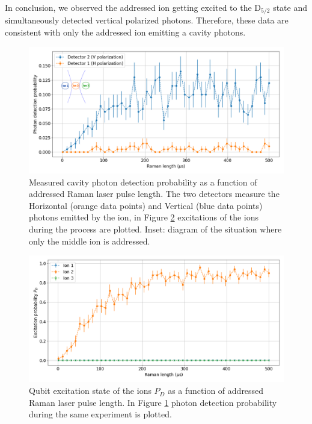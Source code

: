 In conclusion, we observed the addressed ion getting excited to the $\text{D}_{5/2}$ state and simultaneously detected vertical polarized photons. Therefore, these data are consistent with only the addressed ion emitting a cavity photons.
\begin{figure}
\centering
\includegraphics[width=\textwidth]{img/photonefficency_witherror3}
\caption{Measured cavity photon detection probability as a function of addressed Raman laser pulse length. The two detectors measure the Horizontal (orange data points) and Vertical (blue data points) photons emitted by the ion, in Figure \ref{probion} excitations of the ions during the process are plotted. Inset: diagram of the situation where only the middle ion is addressed.}
\label{probphoton}
\end{figure}
\begin{figure}
\centering
\includegraphics[width=\textwidth]{img/ramanlength_witherrors2}
\caption{Qubit excitation state of the ions $P_D$ as a function of addressed Raman laser pulse length. In Figure \ref{probphoton} photon detection probability during the same experiment is plotted.}
\label{probion}
\end{figure}
